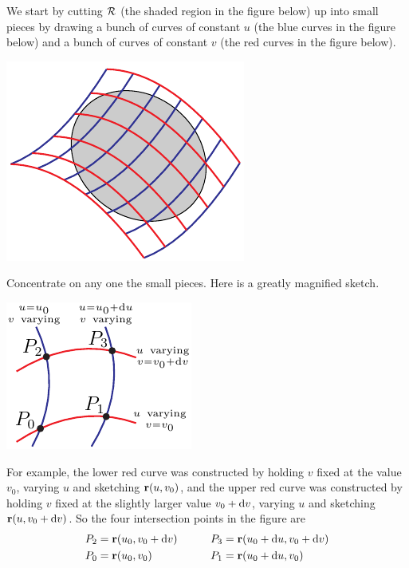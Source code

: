 We start by cutting $\mathcal{R}$ (the shaded region in the figure below) 
up into small pieces by drawing a bunch of curves of constant $u$ 
(the blue curves in the figure below) and a bunch of curves of 
constant $v$ (the red curves in the figure below).
\begin{nfig}
\begin{center}
    \includegraphics{RSlice.pdf}
\end{center}
\end{nfig}
Concentrate on any one the small pieces. Here is a greatly magnified
sketch.
\begin{nfig}
\begin{center}
    \includegraphics{dA.pdf}
\end{center}
\end{nfig}
For example, the  lower red curve was constructed by holding $v$ fixed 
at the value $v_0$, varying $u$ and sketching $\mathbf{r}(u,v_0)$, and 
the  upper red curve was constructed by holding $v$ fixed 
at the slightly larger value $v_0+\mathrm{d}v$, varying $u$ and 
sketching $\mathbf{r}(u,v_0+\mathrm{d}v)$. So the four intersection points in 
the figure are
\begin{alignat*}{3}
P_2&=\mathbf{r}(u_0, v_0+\mathrm{d}v) &\qquad
   P_3&=\mathbf{r}(u_0+\mathrm{d}u, v_0+\mathrm{d}v) \\
P_0&=\mathbf{r}(u_0, v_0) &
   P_1&=\mathbf{r}(u_0+\mathrm{d}u, v_0) 
\end{alignat*}
